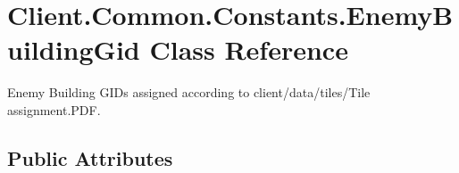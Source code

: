 \hypertarget{classClient_1_1Common_1_1Constants_1_1EnemyBuildingGid}{}\section{Client.\+Common.\+Constants.\+Enemy\+Building\+Gid Class Reference}
\label{classClient_1_1Common_1_1Constants_1_1EnemyBuildingGid}


Enemy Building G\+I\+Ds assigned according to \textquotesingle{}client/data/tiles/\+Tile assignment.\+P\+D\+F\textquotesingle{}.  


\subsection*{Public Attributes}

